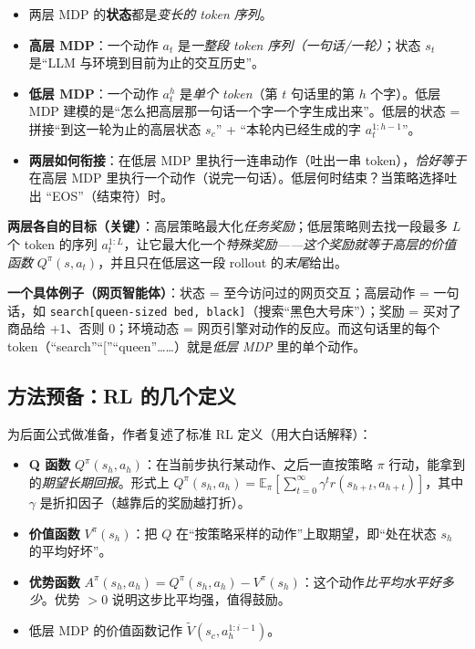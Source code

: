 \documentclass[11pt,UTF8,fontset=fandol]{ctexart}
\begin{document}
\begin{itemize}[leftmargin=1.5em]
\item 两层 MDP 的\textbf{状态}都是\emph{变长的 token 序列}。
\item \textbf{高层 MDP}：一个动作 $a_t$ 是\emph{一整段 token 序列（一句话/一轮）}；状态 $s_t$ 是“LLM 与环境到目前为止的交互历史”。
\item \textbf{低层 MDP}：一个动作 $a^h_t$ 是\emph{单个 token}（第 $t$ 句话里的第 $h$ 个字）。低层 MDP 建模的是“怎么把高层那一句话一个字一个字生成出来”。低层的状态 = 拼接“到这一轮为止的高层状态 $s_c$” + “本轮内已经生成的字 $a^{1:h-1}_t$”。
\item \textbf{两层如何衔接}：在低层 MDP 里执行一连串动作（吐出一串 token），\emph{恰好等于}在高层 MDP 里执行一个动作（说完一句话）。低层何时结束？当策略选择吐出 “EOS”（结束符）时。
\end{itemize}

\textbf{两层各自的目标（关键）}：高层策略最大化\emph{任务奖励}；低层策略则去找一段最多 $L$ 个 token 的序列 $a^{1:L}_t$，让它最大化一个\emph{特殊奖励——这个奖励就等于高层的价值函数} $Q^\pi(s, a_t)$，并且只在低层这一段 rollout 的\emph{末尾}给出。

\textbf{一个具体例子（网页智能体）}：状态 = 至今访问过的网页交互；高层动作 = 一句话，如 \texttt{search[queen-sized bed, black]}（搜索“黑色大号床”）；奖励 = 买对了商品给 +1、否则 0；环境动态 = 网页引擎对动作的反应。而这句话里的每个 token（“search”“[”“queen”……）就是\emph{低层 MDP} 里的单个动作。

\subsection{方法预备：RL 的几个定义}

为后面公式做准备，作者复述了标准 RL 定义（用大白话解释）：
\begin{itemize}[leftmargin=1.5em]
\item \textbf{Q 函数} $Q^\pi(s_h, a_h)$：在当前步执行某动作、之后一直按策略 $\pi$ 行动，能拿到的\emph{期望长期回报}。形式上 $Q^\pi(s_h,a_h)=\mathbb{E}_\pi\!\left[\sum_{t=0}^{\infty}\gamma^t r(s_{h+t}, a_{h+t})\right]$，其中 $\gamma$ 是折扣因子（越靠后的奖励越打折）。
\item \textbf{价值函数} $V^\pi(s_h)$：把 $Q$ 在“按策略采样的动作”上取期望，即“处在状态 $s_h$ 的平均好坏”。
\item \textbf{优势函数} $A^\pi(s_h,a_h)=Q^\pi(s_h,a_h)-V^\pi(s_h)$：这个动作\emph{比平均水平好多少}。优势 $>0$ 说明这步比平均强，值得鼓励。
\item 低层 MDP 的价值函数记作 $\widetilde{V}(s_c, a^{1:i-1}_h)$。
\end{itemize}
\end{document}

